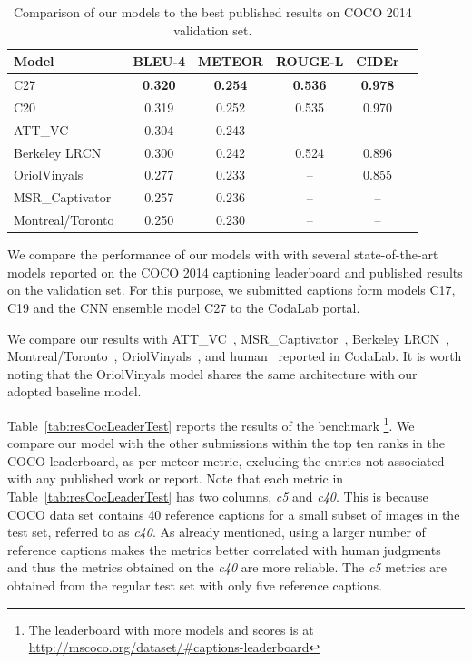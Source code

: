 \begin{table}[htp]
  \centering
  \begin{adjustbox}{center}
  \begin{tabular}{|l|c|c|c|c|c|}
    \hline\hline
    \bf Model  &BLEU-4 &METEOR &ROUGE-L&CIDEr\\\hline
    C27 & \bf0.320&\bf0.254 &\bf0.536 &\bf0.978 \\
    C20 & 0.319 & 0.252 & 0.535 & 0.970 \\\hline
    ATT\_VC~\cite{you2016image} & 0.304& 0.243& -- & -- \\
    Berkeley LRCN~\cite{donahue2015long} & 0.300& 0.242& 0.524 & 0.896 \\
    OriolVinyals~\cite{Vinyals_2015_CVPR} & 0.277& 0.233& -- & 0.855 \\
    MSR\_Captivator~\cite{Fang2015} & 0.257& 0.236& -- & -- \\
    Montreal/Toronto~\cite{Xu2015show} & 0.250& 0.230& -- & -- \\
    \hline \hline
  \end{tabular}
  \end{adjustbox}
  \caption{Comparison of our models to the best published results on COCO 2014 validation set.}
  \label{tab:resCocPubVal}
\end{table}

We compare the performance of our models with with several state-of-the-art
models reported on the COCO 2014 captioning leaderboard and published results on
the validation set.
For this purpose, we submitted captions form models C17, C19 and the CNN
ensemble model C27 to the CodaLab portal.

We compare our results with ATT\_VC~\cite{you2016image},
MSR\_Captivator~\cite{Fang2015}, Berkeley LRCN~\cite{donahue2015long},
Montreal/Toronto~\cite{Xu2015show}, OriolVinyals~\cite{Vinyals_2015_CVPR}, and
human~\cite{Chen2015} reported in CodaLab. It is worth noting that the
OriolVinyals model shares the same architecture with our adopted baseline model.

Table~\ref{tab:resCocLeaderTest} reports the results of the benchmark%
\footnote{The leaderboard with more models and
scores is at \url{http://mscoco.org/dataset/\#captions-leaderboard}}.
We compare our model with the other submissions within the top ten ranks in the
COCO leaderboard, as per meteor metric, excluding the entries not associated
with any published work or report.
Note that each metric in Table~\ref{tab:resCocLeaderTest} has two columns, \emph{c5}
and \emph{c40}. 
This is because COCO data set contains 40 reference captions for a small subset
of images in the test set, referred to as \emph{c40}. 
As already mentioned, using a larger number of reference captions makes the
metrics better correlated with human judgments and thus the metrics obtained on
the \emph{c40} are more reliable.
The \emph{c5} metrics are obtained from the regular test set with only five
reference captions. 

